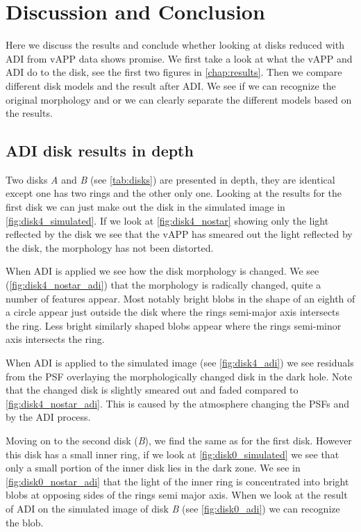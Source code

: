 \chapter{Discussion and Conclusion}

Here we discuss the results and conclude whether looking at disks reduced with \ac{ADI} from \ac{vAPP} data shows promise. We first take a look at what the \ac{vAPP} and \ac{ADI} do to the disk, see the first two figures in \autoref{chap:results}. Then we compare different disk models and the result after \ac{ADI}. We see if we can recognize the original morphology and or we can clearly separate the different models based on the results. 

\section{ADI disk results in depth}
\label{sec:adi_res}
Two disks \textit{A} and \textit{B} (see \autoref{tab:disks}) are presented in depth, they are identical except one has two rings and the other only one. Looking at the results for the first disk we can just make out the disk in the simulated image in \autoref{fig:disk4_simulated}. If we look at \autoref{fig:disk4_nostar} showing only the light reflected by the disk we see that the \ac{vAPP} has smeared out the light reflected by the disk, the morphology has not been distorted. 

When \ac{ADI} is applied we see how the disk morphology is changed. We see (\autoref{fig:disk4_nostar_adi}) that the morphology is radically changed, quite a number of features appear. Most notably bright blobs in the shape of an eighth of a circle appear just outside the disk where the rings semi-major axis intersects the ring. Less bright similarly shaped blobs appear where the rings semi-minor axis intersects the ring.

When \ac{ADI} is applied to the simulated image (see \autoref{fig:disk4_adi}) we see residuals from the \ac{PSF} overlaying the morphologically changed disk in the dark hole. Note that the changed disk is slightly smeared out and faded compared to \autoref{fig:disk4_nostar_adi}. This is caused by the atmosphere changing the \acp{PSF} and by the \ac{ADI} process.

Moving on to the second disk (\textit{B}), we find the same as for the first disk. However this disk has a small inner ring, if we look at \autoref{fig:disk0_simulated} we see that only a small portion of the inner disk lies in the dark zone. We see in \autoref{fig:disk0_nostar_adi} that the light of the inner ring is concentrated into bright blobs at opposing sides of the rings semi major axis. When we look at the result of \ac{ADI} on the simulated image of disk \textit{B} (see \autoref{fig:disk0_adi}) we can recognize the blob. 

